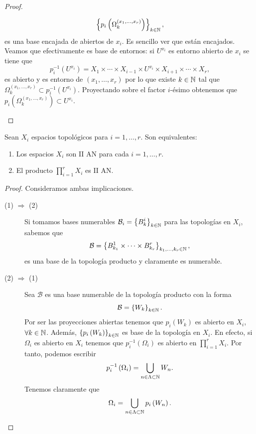 \begin{proof}
\begin{description}
		\[ \left\{ p_{i}\left(\Omega_{k}^{\left(x_{1}, \ldots, x_{r}\right)}\right)\right\} _{k \in \mathbb{N}} ,\]
	es una base encajada de abiertos de $\displaystyle x_{i} $. Es sencillo ver que están encajados. Veamos que efectivamente es base de entornos: si $\displaystyle U^{x_{i}} $ es entorno abierto de $\displaystyle x_{i} $ se tiene que 
	\[p^{-1}_{i}\left(U^{x_{i}}\right)= X_{1} \times \cdots \times X_{i-1} \times U^{x_{i}} \times X_{i+1} \times \cdots \times X_{r} ,\]
	es abierto y es entorno de $\displaystyle \left(x_{1}, \ldots, x_{r}\right) $ por lo que existe $\displaystyle k \in \mathbb{N} $ tal que $\displaystyle \Omega_{k}^{\left(x_{1}, \ldots, x_{r}\right)}\subset p^{-1}_{i}\left(U^{x_{i}}\right) $. Proyectando sobre el factor $\displaystyle i $-ésimo obtenemos que $\displaystyle p_{i}\left(\Omega^{\left(x_{1}, \ldots, x_{r}\right)}_{k}\right)\subset U^{x_{i}} $.
\end{description}
\end{proof}
\begin{prop}
Sean $\displaystyle X_{i} $ espacios topológicos para $\displaystyle i = 1, \ldots, r $. Son equivalentes:
\begin{enumerate}
\item Los espacios $\displaystyle X_{i} $ son II AN para cada $\displaystyle i = 1, \ldots, r $.
\item El producto $\displaystyle \prod^{r}_{i = 1}X_{i} $ es II AN.
\end{enumerate}
\end{prop}
\begin{proof}
Consideramos ambas implicaciones.
\begin{description}
	\item[(1) $\displaystyle \Rightarrow $ (2)] Si tomamos bases numerables $\displaystyle \mathcal{B}_{i} = \left\{ B^{i}_{k}\right\} _{k \in \mathbb{N}} $ para las topologías en $\displaystyle X_{i} $, sabemos que 
		\[\mathcal{B} = \left\{ B^{1}_{k_{1}} \times \cdots \times B^{r}_{k_{r}} \right\} _{k_{1}, \ldots, k_{r} \in \mathbb{N}} ,\]
		es una base de la topología producto y claramente es numerable. 
	\item[(2) $\displaystyle \Rightarrow $ (1)] Sea $\displaystyle \mathcal{B} $ es una base numerable de la topología producto con la forma
		\[\mathcal{B}= \left\{ W_{k}\right\} _{k\in \mathbb{N}} .\]
		Por ser las proyecciones abiertas tenemos que $\displaystyle p_{i}\left(W_{k}\right) $ es abierto en $\displaystyle X_{i} $, $\displaystyle \forall k \in \mathbb{N} $. Además, $\displaystyle \left\{ p_{i}\left(W_{k}\right)\right\} _{k \in \mathbb{N}} $ es base de la topología en $\displaystyle X_{i} $. En efecto, si $\displaystyle \Omega_{i} $ es abierto en $\displaystyle X_{i} $ tenemos que $\displaystyle p^{-1}_{i}\left(\Omega_{i}\right) $ es abierto en $\displaystyle \prod^{r}_{ i= 1}X_{i} $. 
		Por tanto, podemos escribir
		\[p^{-1}_{i}\left(\Omega_{i}\right)=\bigcup_{n\in \Lambda \subset \mathbb{N}}W_{n} .\]
		Tenemos claramente que 
		\[\Omega_{i}=\bigcup_{n \in \Lambda \subset \mathbb{N}}p_{i}\left(W_{n}\right) .\]
\end{description}
\end{proof}
